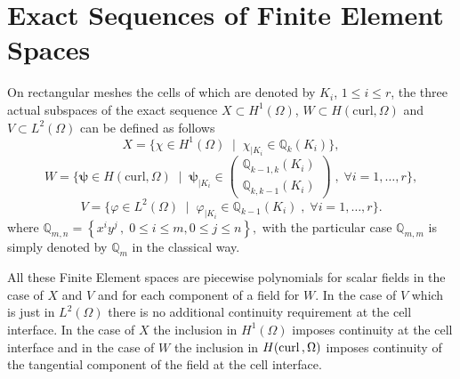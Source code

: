 %

 
 
 \section{Exact Sequences of Finite Element Spaces}

On rectangular meshes the cells of which are denoted by $K_i$, $1\leq i\leq r$, the three actual subspaces of the exact sequence
$X\subset H^1(\Omega)$,
$W\subset
H(\mathrm{curl},\Omega)$ and $V \subset L^2(\Omega)$ can be defined as follows
$$
X=\{\chi \in H^1(\Omega)\;\;|\;\; \chi_{|K_i}\in \mathbb{Q}_k(K_i)\},
$$
$$
W=\{\boldsymbol{\psi}\in
H(\mathrm{curl},\Omega)\;\;|\;\;\boldsymbol{\psi}_{|K_i}\in
\left(\begin{array}{c}
\mathbb{Q}_{k-1,k}(K_i)\\\mathbb{Q}_{k,k-1}(K_i)
\end{array}\right)\;,\;\forall i=1,\dots,r\},
$$
$$
V=\{\varphi\in L^2(\Omega)\;\; | \;\;
\varphi_{|K_i}\in\mathbb{Q}_{k-1}(K_i)\;,\;\forall i=1,\dots,r\}.
$$
where
$\mathbb{Q}_{m,n}=\left\{x^iy^j\,,\;0\le i \le m, 0\le j \le n \right\},$ with the particular case $\mathbb{Q}_{m,m}$ is simply denoted by $\mathbb{Q}_{m}$ in the classical way.

All these Finite Element spaces are piecewise polynomials for scalar fields in the case of $X$ and $V$ and for each component of a field for $W$. In the case of $V$ which is just in $L^2(\Omega)$ there is no additional continuity requirement at the cell interface. In the case of 
$X$ the inclusion in $H^1(\Omega)$ imposes continuity at the cell interface and in the case of $W$ the inclusion in $H(\mathrm{curl}\,,\Omega)$ imposes continuity of the tangential component of the field at the cell interface.

